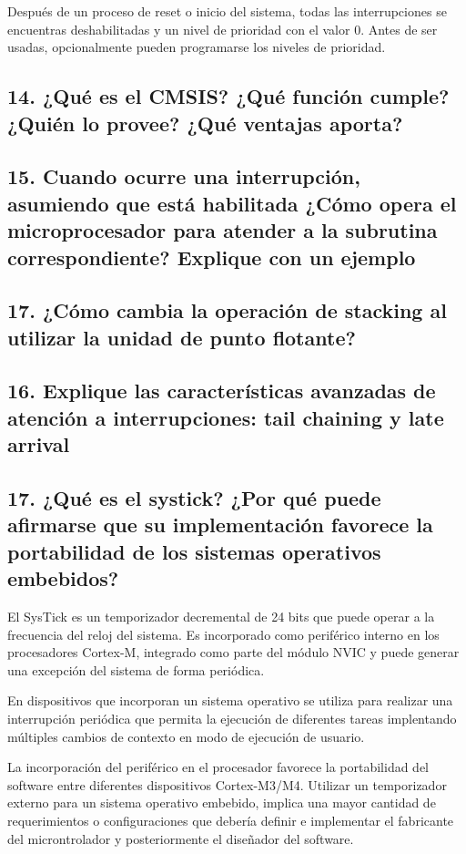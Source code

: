 \documentclass[10pt,a4paper,twoside,spanish]{article}	%
\begin{document}
Después de un proceso de reset o inicio del sistema, todas las interrupciones se encuentras deshabilitadas y un nivel de prioridad con el valor 0. Antes de ser usadas, opcionalmente pueden programarse los niveles de prioridad.


\subsection*{14. ¿Qué es el CMSIS? ¿Qué función cumple? ¿Quién lo provee? ¿Qué ventajas aporta?}

\subsection*{15. Cuando ocurre una interrupción, asumiendo que está habilitada ¿Cómo opera el microprocesador para atender a la subrutina correspondiente? Explique con un ejemplo}

\subsection*{17. ¿Cómo cambia la operación de stacking al utilizar la unidad de punto flotante?}

\subsection*{16. Explique las características avanzadas de atención a interrupciones: tail chaining y late arrival}

\subsection*{17. ¿Qué es el systick? ¿Por qué puede afirmarse que su implementación favorece la portabilidad de los sistemas operativos embebidos?}

El SysTick es un temporizador decremental de 24 bits que puede operar a la frecuencia del reloj del sistema. Es incorporado como periférico interno en los procesadores Cortex-M, integrado como parte del módulo NVIC y puede generar una excepción del sistema de forma periódica.

En dispositivos que incorporan un sistema operativo se utiliza para realizar una interrupción periódica que permita la ejecución de diferentes tareas implentando múltiples cambios de contexto en modo de ejecución de usuario. 

La incorporación del periférico en el procesador favorece la portabilidad del software entre diferentes dispositivos Cortex-M3/M4. Utilizar un temporizador externo para un sistema operativo embebido, implica una mayor cantidad de requerimientos o configuraciones que debería definir e implementar el fabricante del microntrolador y posteriormente el diseñador del software.  
\end{document}
